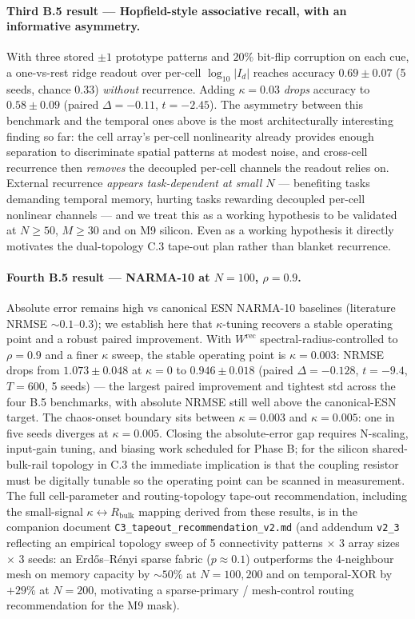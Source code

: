 \documentclass[fontsize=10pt]{article}
\begin{document}
\paragraph{Third B.5 result --- Hopfield-style associative recall, with an informative asymmetry.}
With three stored $\pm 1$ prototype patterns and $20\%$ bit-flip corruption on
each cue, a one-vs-rest ridge readout over per-cell $\log_{10}|I_d|$ reaches
accuracy $\mathbf{0.69 \pm 0.07}$ (5 seeds, chance $0.33$) \emph{without} recurrence.
Adding $\kappa=0.03$ \emph{drops} accuracy to $0.58 \pm 0.09$ (paired
$\Delta = -0.11$, $t = -2.45$). The asymmetry between this benchmark and the
temporal ones above is the most architecturally interesting finding so far:
the cell array's per-cell nonlinearity already provides enough separation to
discriminate spatial patterns at modest noise, and cross-cell recurrence then
\emph{removes} the decoupled per-cell channels the readout relies on. External
recurrence \emph{appears task-dependent at small $N$} --- benefiting tasks
demanding temporal memory, hurting tasks rewarding decoupled per-cell
nonlinear channels --- and we treat this as a working hypothesis to be
validated at $N{\geq}50$, $M{\geq}30$ and on M9 silicon. Even as a working
hypothesis it directly motivates the dual-topology C.3 tape-out plan rather
than blanket recurrence.

\paragraph{Fourth B.5 result --- NARMA-10 at $N=100$, $\rho=0.9$.}
Absolute error remains high vs canonical ESN NARMA-10 baselines (literature
NRMSE $\sim 0.1$--$0.3$); we establish here that $\kappa$-tuning recovers a
stable operating point and a robust paired improvement. With $W^{\mathrm{rec}}$
spectral-radius-controlled to $\rho=0.9$ and a finer $\kappa$ sweep, the
stable operating point is $\kappa=0.003$: NRMSE drops from $1.073 \pm 0.048$
at $\kappa=0$ to $\mathbf{0.946 \pm 0.018}$ (paired $\Delta = -0.128$,
$t = -9.4$, $T=600$, 5 seeds) --- the largest paired improvement and tightest
std across the four B.5 benchmarks, with absolute NRMSE still well above the
canonical-ESN target. The chaos-onset boundary sits between $\kappa=0.003$
and $\kappa=0.005$: one in five seeds diverges at $\kappa=0.005$. Closing
the absolute-error gap requires N-scaling, input-gain tuning, and biasing
work scheduled for Phase B; for the silicon shared-bulk-rail topology in
C.3 the immediate implication is that the coupling resistor must be
digitally tunable so the operating point can be scanned in measurement.
The full cell-parameter and routing-topology tape-out recommendation,
including the small-signal $\kappa \leftrightarrow R_{\mathrm{bulk}}$
mapping derived from these results, is in the companion document
\texttt{C3\_tapeout\_recommendation\_v2.md} (and addendum
\texttt{v2\_3} reflecting an empirical topology sweep of
5 connectivity patterns $\times$ 3 array sizes $\times$ 3 seeds: an
Erd\H{o}s--R\'enyi sparse fabric ($p \approx 0.1$) outperforms the
4-neighbour mesh on memory capacity by $\sim 50\%$ at $N{=}100, 200$
and on temporal-XOR by $+29\%$ at $N{=}200$, motivating a
sparse-primary / mesh-control routing recommendation for the M9
mask).
\end{document}

